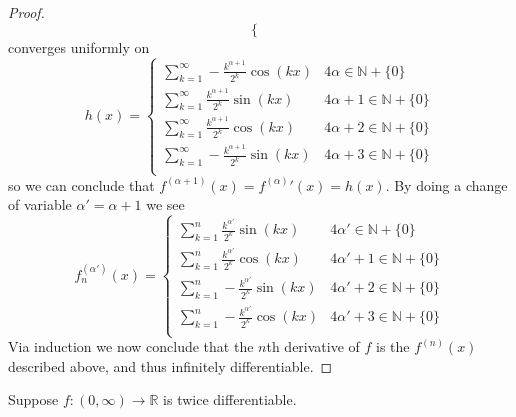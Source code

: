 \documentclass[12pt]{article}
\makeatletter
\theoremstyle{homework}
\newenvironment{exercise}[1]
{\def\@currentlabel{#1}\exercisecore}
{\endexercisecore}
\newcommand{\Reals}{\ensuremath{\mathbb R}}
\let\RR\Reals
\makeatother
\begin{document}
\begin{proof}
$$\begin{cases}
\end{cases}$$
converges uniformly on $$h(x)=\begin{cases}
\sum_{k=1}^\infty -\frac{k^{\alpha+1}}{2^k}\cos(kx) & 4\alpha\in\mathbb{N}+\{0\}\\
\sum_{k=1}^\infty \frac{k^{\alpha+1}}{2^k}\sin(kx) & 4\alpha+1 \in\mathbb{N}+\{0\}\\
\sum_{k=1}^\infty \frac{k^{\alpha+1}}{2^k}\cos(kx) & 4\alpha+2 \in\mathbb{N}+\{0\}\\
\sum_{k=1}^\infty -\frac{k^{\alpha+1}}{2^k}\sin(kx) & 4\alpha+3 \in\mathbb{N}+\{0\}\\
\end{cases}$$
so we can conclude that ${f^{(\alpha+1)}}(x)={f^{(\alpha)}}'(x)=h(x)$.  By doing a change of variable $\alpha'=\alpha+1$ we see $$f^{(\alpha')}_n(x)=\begin{cases}
\sum_{k=1}^n \frac{k^{\alpha'}}{2^k}\sin(kx) & 4\alpha'\in\mathbb{N}+\{0\}\\
\sum_{k=1}^n \frac{k^{\alpha'}}{2^k}\cos(kx) & 4\alpha'+1 \in\mathbb{N}+\{0\}\\
\sum_{k=1}^n -\frac{k^{\alpha'}}{2^k}\sin(kx) & 4\alpha'+2 \in\mathbb{N}+\{0\}\\
\sum_{k=1}^n -\frac{k^{\alpha'}}{2^k}\cos(kx) & 4\alpha'+3 \in\mathbb{N}+\{0\}\\
\end{cases}$$
Via induction we now conclude that the $n$th derivative of $f$ is the $f^{(n)}(x)$ described above, and thus infinitely differentiable.
\end{proof}
\begin{exercise}
{10}
Suppose $f:(0,\infty)\to \RR$ is twice differentiable.
\end{exercise}
\end{document}
